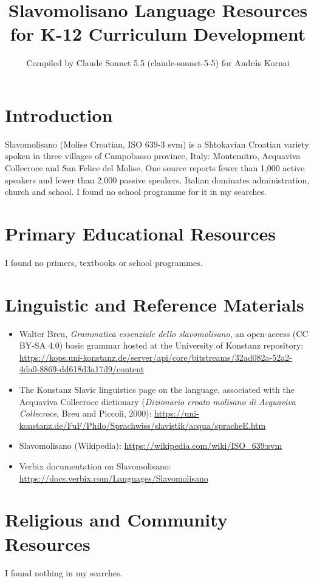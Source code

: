 \documentclass[12pt]{article}
\title{Slavomolisano Language Resources for K-12 Curriculum Development}
\author{Compiled by Claude Sonnet 5.5 (claude-sonnet-5-5) for Andr\'as Kornai}
\date{}
\begin{document}
\maketitle

\section{Introduction}
Slavomolisano (Molise Croatian, ISO 639-3 svm) is a Shtokavian Croatian variety spoken in three villages of Campobasso province, Italy: Montemitro, Acquaviva Collecroce and San Felice del Molise. One source reports fewer than 1,000 active speakers and fewer than 2,000 passive speakers. Italian dominates administration, church and school. I found no school programme for it in my searches.

\section{Primary Educational Resources}
I found no primers, textbooks or school programmes.

\section{Linguistic and Reference Materials}
\begin{itemize}
\item Walter Breu, \emph{Grammatica essenziale dello slavomolisano}, an open-access (CC BY-SA 4.0) basic grammar hosted at the University of Konstanz repository: \url{https://kops.uni-konstanz.de/server/api/core/bitstreams/32ad082a-52a2-4da0-8869-dd618d3a17d9/content}
\item The Konstanz Slavic linguistics page on the language, associated with the Acquaviva Collecroce dictionary (\emph{Dizionario croato molisano di Acquaviva Collecroce}, Breu and Piccoli, 2000): \url{https://uni-konstanz.de/FuF/Philo/Sprachwiss/slavistik/acqua/spracheE.htm}
\item Slavomolisano (Wikipedia): \url{https://wikipedia.com/wiki/ISO_639:svm}
\item Verbix documentation on Slavomolisano: \url{https://docs.verbix.com/Languages/Slavomolisano}
\end{itemize}

\section{Religious and Community Resources}
I found nothing in my searches.
\end{document}
